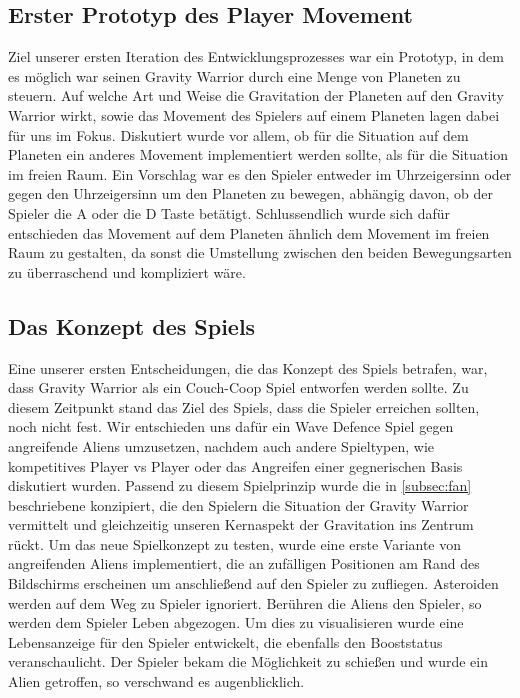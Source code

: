 \documentclass[11pt]{scrartcl}
\begin{document}
\subsection{Erster Prototyp des Player Movement}
Ziel unserer ersten Iteration des Entwicklungsprozesses war ein Prototyp, in dem es möglich war seinen Gravity Warrior durch eine Menge von Planeten zu steuern. Auf welche Art und Weise die Gravitation der Planeten auf den Gravity Warrior wirkt, sowie das Movement des Spielers auf einem Planeten lagen dabei für uns im Fokus. Diskutiert wurde vor allem, ob für die Situation auf dem Planeten ein anderes Movement implementiert werden sollte, als für die Situation im freien Raum. Ein Vorschlag war es den Spieler entweder im Uhrzeigersinn oder gegen den Uhrzeigersinn um den Planeten zu bewegen, abhängig davon, ob der Spieler die A oder die D Taste betätigt. Schlussendlich wurde sich dafür entschieden das Movement auf dem Planeten ähnlich dem Movement im freien Raum zu gestalten, da sonst die Umstellung zwischen den beiden Bewegungsarten zu überraschend und kompliziert wäre.

\subsection{Das Konzept des Spiels}
Eine unserer ersten Entscheidungen, die das Konzept des Spiels betrafen, war, dass Gravity Warrior als ein Couch-Coop Spiel entworfen werden sollte.
Zu diesem Zeitpunkt stand das Ziel des Spiels, dass die Spieler erreichen sollten, noch nicht fest. Wir entschieden uns dafür ein Wave Defence Spiel gegen angreifende Aliens umzusetzen, nachdem auch andere Spieltypen, wie kompetitives Player vs Player oder das Angreifen einer gegnerischen Basis diskutiert wurden.
Passend zu diesem Spielprinzip wurde die in \autoref{subsec:fan} beschriebene  konzipiert, die den Spielern die Situation der Gravity Warrior vermittelt und gleichzeitig unseren Kernaspekt der Gravitation ins Zentrum rückt.
Um das neue Spielkonzept zu testen, wurde eine erste Variante von angreifenden Aliens implementiert, die an zufälligen Positionen am Rand des Bildschirms erscheinen um anschließend auf den Spieler zu zufliegen. Asteroiden werden auf dem Weg zu Spieler ignoriert. Berühren die Aliens den Spieler, so werden dem Spieler Leben abgezogen. Um dies zu visualisieren wurde eine Lebensanzeige für den Spieler entwickelt, die ebenfalls den Booststatus veranschaulicht.
Der Spieler bekam die Möglichkeit zu schießen und wurde ein Alien getroffen, so verschwand es augenblicklich.
\end{document}
